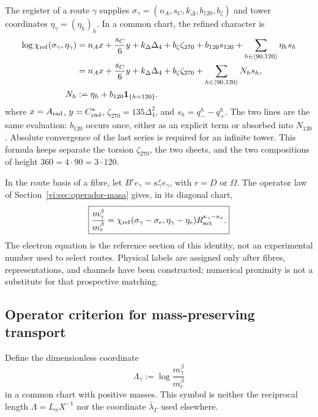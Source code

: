 The register of a route $\gamma$ supplies
$\sigma_\gamma=(n_A,s_C,k_\Delta,b_{120},b_\zeta)$ and tower coordinates
$\eta_\gamma=(\eta_h)_h$. In a common chart, the refined character is
\begin{equation}
 \begin{aligned}
 \log\chi_{\rm ref}(\sigma_\gamma,\eta_\gamma)
 &=n_Ax+\frac{s_C}{6}y+k_\Delta\Delta_4+b_\zeta\zeta_{270}
   +b_{120}s_{120}+\sum_{h\in\langle90,120\rangle}\eta_hs_h\\
 &=n_Ax+\frac{s_C}{6}y+k_\Delta\Delta_4+b_\zeta\zeta_{270}
   +\sum_{h\in\langle90,120\rangle}N_hs_h,\\
 N_h&:=\eta_h+b_{120}\mathbf1_{\{h=120\}}.
 \end{aligned}
 \label{vi:eq:caracter-refinado-explicito}
\end{equation}
where $x=A_{\rm rad}$, $y=C^*_{\rm rad}$,
$\zeta_{270}=135\Delta_4^2$, and $s_h=q_-^h-q_+^h$. The two lines are the
same evaluation: $b_{120}$ occurs once, either as an explicit term or absorbed
into $N_{120}$. Absolute convergence of the last series is required for an
infinite tower. This formula keeps separate the torsion $\zeta_{270}$, the two
sheets, and the two compositions of height $360=4\cdot90=3\cdot120$.

In the route basis of a fibre, let $B^r e_\gamma=\kappa_\gamma^r e_\gamma$,
with $r=D$ or $\Omega$. The operator law of
Section~\ref{vi:sec:operador-masa} gives, in its diagonal chart,
\begin{equation}
 \boxed{
 \frac{m_\gamma^\beta}{m_e^\beta}=
 \chi_{\rm ref}(\sigma_\gamma-\sigma_e,
                 \eta_\gamma-\eta_e)
 R_{\rm act}^{\kappa_\gamma-\kappa_e}.}
 \label{vi:eq:ley-masas-trayectoria}
\end{equation}
The electron equation is the reference section of this identity, not an
experimental number used to select routes. Physical labels are assigned only
after fibres, representations, and channels have been constructed; numerical
proximity is not a substitute for that prospective matching.

\subsection{Operator criterion for mass-preserving transport}

Define the dimensionless coordinate
\begin{equation}
 \Lambda_\gamma:=\log\frac{m_\gamma^\beta}{m_e^\beta}
 \label{vi:eq:lambda-masa-ruta}
\end{equation}
in a common chart with positive masses. This symbol is neither the reciprocal
length $\Lambda=L_\alpha X^{-1}$ nor the coordinate
$\bar\lambda_\Gamma$ used elsewhere.


